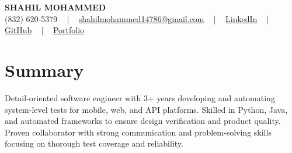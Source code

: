 \documentclass[letterpaper,10pt]{article}
\begin{document}
\begin{center}
    {\fontsize{14pt}{12pt}\selectfont \textbf{\MakeUppercase{Shahil Mohammed}}}\\ \vspace{2pt}
    \fontsize{10pt}{12pt}\selectfont (832) 620-5379 ~ | ~ \href{mailto:shahilmohammed14786@gmail.com}{shahilmohammed14786@gmail.com} ~ | ~  
    \href{https://www.linkedin.com/in/shahil-mohammed-9652931a1/}{\color{blue}\underline{LinkedIn}}  ~ | ~ 
    \href{https://github.com/freakbeast14}{\color{blue}\underline{GitHub}} ~ | ~ 
    \href{https://shahil-mohammed.netlify.app/}{\color{blue}\underline{Portfolio}}
    \vspace{-8pt}
\end{center}

\section{Summary}
\vspace{-2pt}\fontsize{8pt}{9pt}\selectfont
Detail-oriented software engineer with 3+ years developing and automating system-level tests for mobile, web, and API platforms. Skilled in Python, Java, and automated frameworks to ensure design verification and product quality. Proven collaborator with strong communication and problem-solving skills focusing on thorough test coverage and reliability.
 \vspace{-5pt}
 
\vspace{-2pt}
\end{document}
